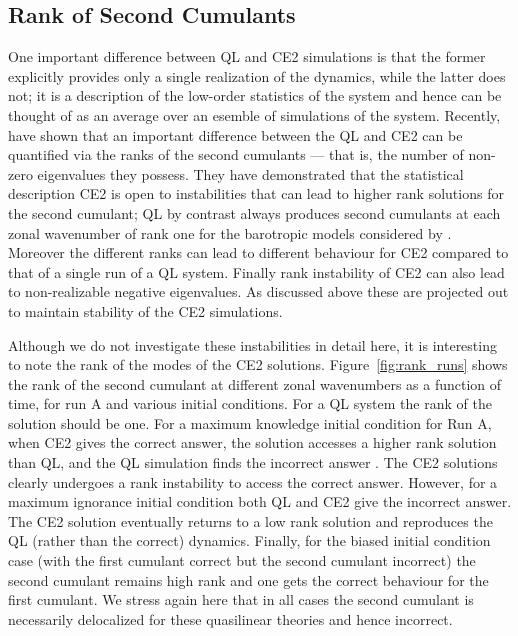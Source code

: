 \documentclass{jfm}
\newcommand{\cu}{c_u}
\begin{document}

%
\subsection{Rank of Second Cumulants}
\label{sec:rank}
One important difference between QL and CE2 simulations is that the former explicitly provides only a single realization of the dynamics, while the latter does not; it is a description of the low-order statistics of the system and hence can be thought of as an average over an esemble of simulations of the system. 
Recently, \citet{nivarti_22} have shown that an important difference between the QL and CE2 can be quantified via the ranks of the second cumulants --- that is, the number of non-zero eigenvalues they possess. They have demonstrated that the statistical description CE2 is open to instabilities that can lead to higher rank solutions for the second cumulant; QL by contrast always produces second cumulants at each zonal wavenumber of rank one for the barotropic models considered by \citet{nivarti_22}. Moreover the different ranks can lead to different behaviour for CE2 compared to that of a single run of a QL system.  Finally rank instability of CE2 can also lead to non-realizable negative eigenvalues.  As discussed above these are projected out to maintain stability of the CE2 simulations.  

Although we do not investigate these instabilities in detail here, it is interesting to note the rank of the modes of the CE2 solutions. Figure~\ref{fig:rank_runs} shows the rank of the second cumulant at different zonal wavenumbers as a function of time, for run A and various initial conditions. For a QL system the rank of the solution should be one.
For a maximum knowledge initial condition for Run A, when CE2 gives the correct answer, the solution accesses a higher rank solution than QL, and the QL simulation finds the incorrect answer 
\citep{tom_2018}. The CE2 solutions clearly undergoes a rank instability to access the correct answer. However, for a maximum ignorance initial condition both QL and CE2 give the incorrect answer. The CE2 solution eventually returns to a low rank solution and reproduces the QL (rather than the correct) dynamics. Finally, for the 
biased initial condition case (with the first cumulant correct but the second cumulant incorrect) the second cumulant remains high rank and one gets the correct behaviour for the first cumulant. We stress again here that in all cases the second cumulant is necessarily delocalized for these quasilinear theories and hence incorrect.
\end{document}
